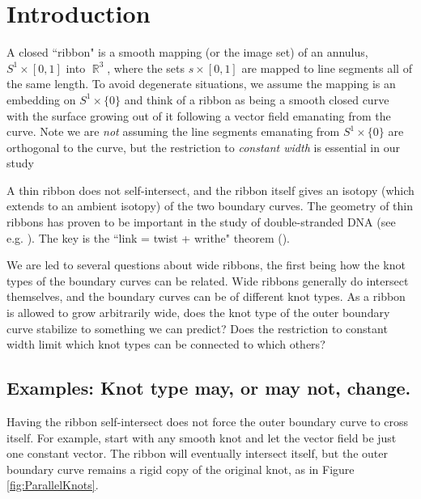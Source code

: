 \documentclass[12pt]{article}
\numberwithin{equation}{subsection}
\theoremstyle{definition}
\numberwithin{lem}{section}
\DeclareMathOperator{\R}{\mathbb{R}}
\def\v{\vspace{0.1in}}
\begin{document}

\section{Introduction}
\label{sec:intro}

A closed ``ribbon" is a smooth mapping (or the image set) of an annulus, $S^1 \times [0,1]$ into $\R^3$, where the sets ${s} \times [0,1]$ are mapped to line segments all of the same length. To avoid degenerate situations, we assume the mapping is an embedding on $S^1 \times \{0\}$ and  think of a ribbon as being a smooth closed curve with the surface growing out of it following a vector field emanating from the curve. Note we are {\em not} assuming the line segments emanating from $S^1 \times \{0\}$ are orthogonal to the curve, but the restriction to  {\em constant width} is essential in our study

A thin ribbon does not self-intersect, and the ribbon itself gives an isotopy (which extends to an ambient isotopy)  of the two boundary curves. The geometry of thin ribbons has proven to be important in the study of double-stranded DNA  (see e.g. \cite{DS92, ER96}). The key is the   ``link = twist + writhe"  theorem (\cite{GC61,FF71,JW69}).  

\v
We are led to several questions about wide ribbons, the first being how the knot types of the boundary curves can be related. Wide ribbons generally do intersect themselves, and the boundary curves can be of different knot types.  As a ribbon is allowed to grow arbitrarily wide, does the knot type of the outer boundary curve stabilize to something we can predict? Does the restriction to constant width limit which knot types can be connected to which others? 


\subsection{Examples: Knot type may, or may not, change.}
Having the ribbon self-intersect does not force the outer boundary curve to cross itself. For example, start with any smooth knot and let the vector field be just one constant vector. The ribbon will eventually intersect itself, but the outer boundary curve remains a rigid copy of the original knot, as in  Figure \ref{fig:ParallelKnots}.
 
\end{document}
